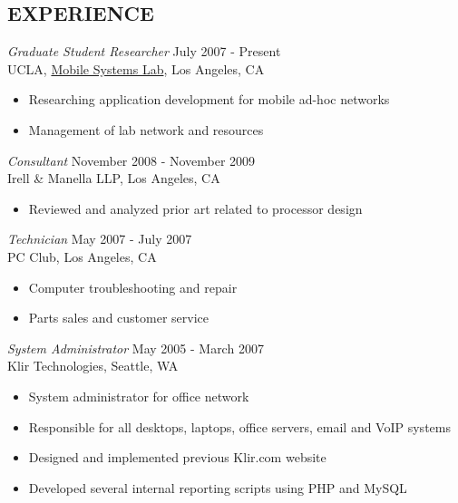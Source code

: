 \documentclass[margin]{res}
\begin{document}
\begin{resume}
\section{EXPERIENCE}

		{\sl Graduate Student Researcher} \hfill July 2007 - Present \\
                UCLA, \href{http://msl.cs.ucla.edu}{Mobile Systems Lab}, Los Angeles, CA
                 \begin{itemize}  \itemsep -2pt %
                \item Researching application development for mobile ad-hoc networks
		\item Management of lab network and resources
                \end{itemize}

		{\sl Consultant} \hfill November 2008 - November 2009 \\
		Irell \& Manella LLP, Los Angeles, CA
                 \begin{itemize}  \itemsep -2pt %
                \item Reviewed and analyzed prior art related to processor design
                \end{itemize}

		{\sl Technician} \hfill May 2007 - July 2007 \\
		PC Club, Los Angeles, CA
                 \begin{itemize}  \itemsep -2pt %
                \item Computer troubleshooting and repair
                \item Parts sales and customer service
                \end{itemize}

		{\sl System Administrator} \hfill May 2005 - March 2007 \\
                Klir Technologies, Seattle, WA 
                 \begin{itemize}  \itemsep -2pt %
                \item System administrator for office network
		\item Responsible for all desktops, laptops, office servers, email and VoIP systems
		\item Designed and implemented previous Klir.com website
		\item Developed several internal reporting scripts using PHP and MySQL
                \end{itemize}


\end{resume}
\end{document}
